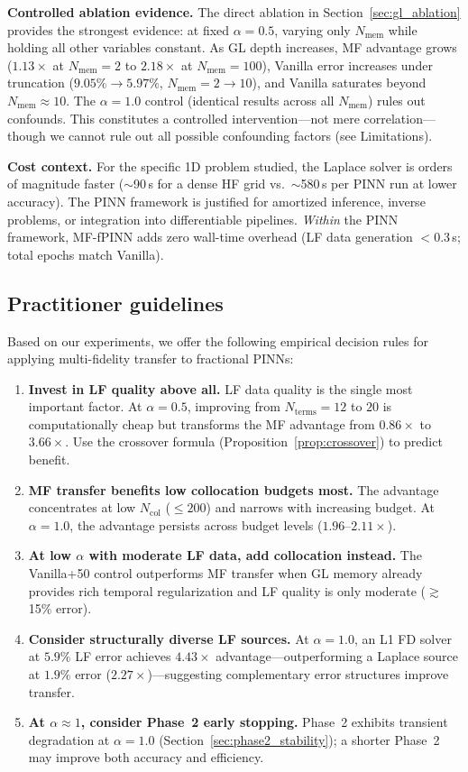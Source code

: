 \documentclass[preprint,12pt]{elsarticle}
\newcommand{\Ncol}{N_{\mathrm{col}}}
\begin{document}
\textbf{Controlled ablation evidence.} The direct ablation in Section~\ref{sec:gl_ablation} provides the strongest evidence: at fixed $\alpha = 0.5$, varying only $N_{\mathrm{mem}}$ while holding all other variables constant. As GL depth increases, MF advantage grows ($1.13\times$ at $N_{\mathrm{mem}} = 2$ to $2.18\times$ at $N_{\mathrm{mem}} = 100$), Vanilla error increases under truncation ($9.05\% \to 5.97\%$, $N_{\mathrm{mem}} = 2 \to 10$), and Vanilla saturates beyond $N_{\mathrm{mem}} \approx 10$. The $\alpha = 1.0$ control (identical results across all $N_{\mathrm{mem}}$) rules out confounds. This constitutes a controlled intervention---not mere correlation---though we cannot rule out all possible confounding factors (see Limitations).

\textbf{Cost context.} For the specific 1D problem studied, the Laplace solver is orders of magnitude faster ($\sim$90\,s for a dense HF grid vs.\ $\sim$580\,s per PINN run at lower accuracy). The PINN framework is justified for amortized inference, inverse problems, or integration into differentiable pipelines. \emph{Within} the PINN framework, MF-fPINN adds zero wall-time overhead (LF data generation $<$0.3\,s; total epochs match Vanilla).

\subsection{Practitioner guidelines}

Based on our experiments, we offer the following empirical decision rules for applying multi-fidelity transfer to fractional PINNs:
\begin{enumerate}
    \item \textbf{Invest in LF quality above all.} LF data quality is the single most important factor. At $\alpha = 0.5$, improving from $N_{\mathrm{terms}} = 12$ to $20$ is computationally cheap but transforms the MF advantage from $0.86\times$ to $3.66\times$. Use the crossover formula (Proposition~\ref{prop:crossover}) to predict benefit.
    \item \textbf{MF transfer benefits low collocation budgets most.} The advantage concentrates at low $\Ncol$ ($\leq 200$) and narrows with increasing budget. At $\alpha = 1.0$, the advantage persists across budget levels ($1.96$--$2.11\times$).
    \item \textbf{At low $\alpha$ with moderate LF data, add collocation instead.} The Vanilla+50 control outperforms MF transfer when GL memory already provides rich temporal regularization and LF quality is only moderate ($\gtrsim$15\% error).
    \item \textbf{Consider structurally diverse LF sources.} At $\alpha = 1.0$, an L1 FD solver at $5.9\%$ LF error achieves $4.43\times$ advantage---outperforming a Laplace source at $1.9\%$ error ($2.27\times$)---suggesting complementary error structures improve transfer.
    \item \textbf{At $\alpha \approx 1$, consider Phase~2 early stopping.} Phase~2 exhibits transient degradation at $\alpha = 1.0$ (Section~\ref{sec:phase2_stability}); a shorter Phase~2 may improve both accuracy and efficiency.
\end{enumerate}
\end{document}
